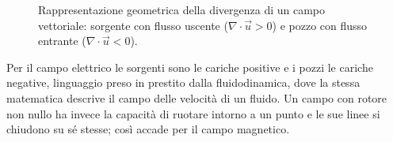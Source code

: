 \documentclass[11pt,a4paper]{article}
\begin{document}
\begin{figure}[htbp]
	\caption{Rappresentazione geometrica della divergenza di un campo vettoriale: sorgente con flusso uscente ($\nabla \cdot \vec{u} > 0$) e pozzo con flusso entrante ($\nabla \cdot \vec{u} < 0$).}
	\label{fig:divergenza_sorgente_pozzo}
\end{figure}

Per il campo elettrico le sorgenti sono le cariche positive e i pozzi le cariche negative, linguaggio preso in prestito dalla fluidodinamica, dove la stessa matematica descrive il campo delle velocità di un fluido. Un campo con rotore non nullo ha invece la capacità di ruotare intorno a un punto e le sue linee si chiudono su sé stesse; così accade per il campo magnetico. 
\end{document}
